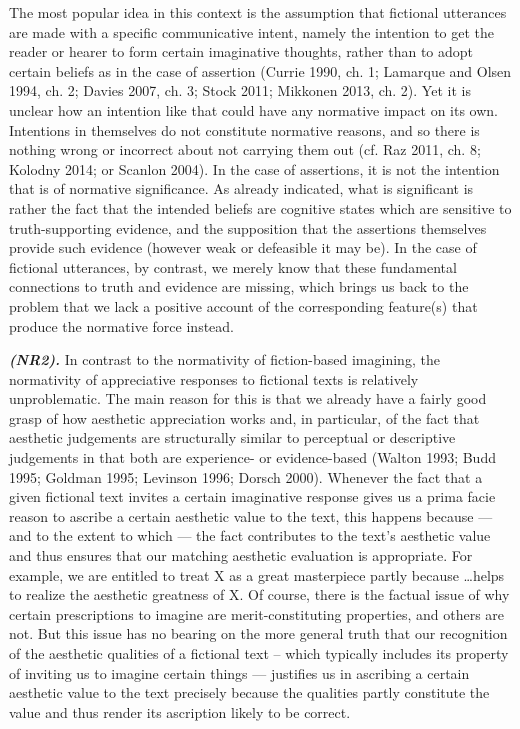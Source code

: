 {The most popular idea in this context is the assumption that fictional utterances are made with a specific communicative intent, namely the intention to get the reader or hearer to form certain imaginative thoughts, rather than to adopt certain beliefs as in the case of assertion (Currie 1990, ch. 1; Lamarque and Olsen 1994, ch. 2; Davies 2007, ch. 3; Stock 2011; Mikkonen 2013, ch. 2). Yet it is unclear how an intention like that could have any normative impact on its own. Intentions in themselves do not constitute normative reasons, and so there is nothing wrong or incorrect about not carrying them out (cf. Raz 2011, ch. 8; Kolodny 2014; or Scanlon 2004). In the case of assertions, it is not the intention that is of normative significance. As already indicated, what is significant is rather the fact that the intended beliefs are cognitive states which are sensitive to truth-supporting evidence, and the supposition that the assertions themselves provide such evidence (however weak or defeasible it may be). In the case of fictional utterances, by contrast, we merely know that these fundamental connections to truth and evidence are missing, which brings us back to the problem that we lack a positive account of the corresponding feature(s) that produce the normative force instead.

\vspace{.2cm}
\noindent\textbf{\emph{(NR2).}} In contrast to the normativity of fiction-based imagining, the normativity of appreciative responses to fictional texts is relatively unproblematic. The main reason for this is that we already have a fairly good grasp of how aesthetic appreciation works and, in particular, of the fact that aesthetic judgements are structurally similar to perceptual or descriptive judgements in that both are experience- or evidence-based (Walton 1993; Budd 1995; Goldman 1995; Levinson 1996; Dorsch 2000). Whenever the fact that a given fictional text invites a certain imaginative response gives us a prima facie reason to ascribe a certain aesthetic value to the text, this happens because --- and to the extent to which --- the fact contributes to the text's aesthetic value and thus ensures that our matching aesthetic evaluation is appropriate. For example, we are entitled to treat X as a great masterpiece partly because \ldots helps to realize the aesthetic greatness of X. Of course, there is the factual issue of why certain prescriptions to imagine are merit-constituting properties, and others are not. But this issue has no bearing on the more general truth that our recognition of the aesthetic qualities of a fictional text -- which typically includes its property of inviting us to imagine certain things --- justifies us in ascribing a certain aesthetic value to the text precisely because the qualities partly constitute the value and thus render its ascription likely to be correct.

}
